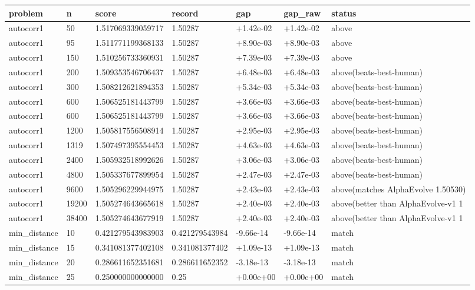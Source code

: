 \begin{longtable}{lllllll}
\hline
problem & n & score & record & gap & gap\_raw & status \\
\hline
\endhead
autocorr1 & 50 & 1.517069339059717 & 1.50287 & +1.42e-02 & +1.42e-02 & above \\
autocorr1 & 95 & 1.511771199368133 & 1.50287 & +8.90e-03 & +8.90e-03 & above \\
autocorr1 & 150 & 1.510256733360931 & 1.50287 & +7.39e-03 & +7.39e-03 & above \\
autocorr1 & 200 & 1.509353546706437 & 1.50287 & +6.48e-03 & +6.48e-03 & above(beats-best-human) \\
autocorr1 & 300 & 1.508212621894353 & 1.50287 & +5.34e-03 & +5.34e-03 & above(beats-best-human) \\
autocorr1 & 600 & 1.506525181443799 & 1.50287 & +3.66e-03 & +3.66e-03 & above(beats-best-human) \\
autocorr1 & 600 & 1.506525181443799 & 1.50287 & +3.66e-03 & +3.66e-03 & above(beats-best-human) \\
autocorr1 & 1200 & 1.505817556508914 & 1.50287 & +2.95e-03 & +2.95e-03 & above(beats-best-human) \\
autocorr1 & 1319 & 1.507497395554453 & 1.50287 & +4.63e-03 & +4.63e-03 & above(beats-best-human) \\
autocorr1 & 2400 & 1.505932518992626 & 1.50287 & +3.06e-03 & +3.06e-03 & above(beats-best-human) \\
autocorr1 & 4800 & 1.505337677899954 & 1.50287 & +2.47e-03 & +2.47e-03 & above(beats-best-human) \\
autocorr1 & 9600 & 1.505296229944975 & 1.50287 & +2.43e-03 & +2.43e-03 & above(matches AlphaEvolve 1.50530) \\
autocorr1 & 19200 & 1.505274643665618 & 1.50287 & +2.40e-03 & +2.40e-03 & above(better than AlphaEvolve-v1 1 \\
autocorr1 & 38400 & 1.505274643677919 & 1.50287 & +2.40e-03 & +2.40e-03 & above(better than AlphaEvolve-v1 1 \\
min\_distance & 10 & 0.421279543983903 & 0.421279543984 & -9.66e-14 & -9.66e-14 & match \\
min\_distance & 15 & 0.341081377402108 & 0.341081377402 & +1.09e-13 & +1.09e-13 & match \\
min\_distance & 20 & 0.286611652351681 & 0.286611652352 & -3.18e-13 & -3.18e-13 & match \\
min\_distance & 25 & 0.250000000000000 & 0.25 & +0.00e+00 & +0.00e+00 & match \\

\end{longtable}
